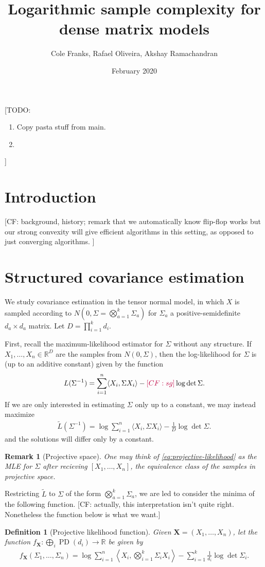 \documentclass{article}
\title{Logarithmic sample complexity for dense matrix models}
\author{Cole Franks, Rafael Oliveira, Akshay Ramachandran}
\date{February 2020}
\newtheorem{remark}{Remark}
\newtheorem{definition}{Definition}
\newcommand{\R}{{\mathbb{R}}}
\renewcommand{\vec}{\bm}
\newcommand\PD{\operatorname{PD}}
\newcommand{\CF}[1]{{\color{purple}[CF: #1]}}
\newcommand{\TODO}[1]{{\color{blue}[TODO: #1]}}
\begin{document}
\maketitle
\TODO{
\begin{enumerate}
\item Copy pasta stuff from main.
\item 
\end{enumerate}

}


\section{Introduction}
\CF{background, history; remark that we automatically know flip-flop works but our strong convexity will give efficient algorithms in this setting, as opposed to just converging algorithms. } 

\section{Structured covariance estimation}
We study covariance estimation in the tensor normal model, in which $X$ is sampled according to $N(0, \Sigma = \bigotimes_{a = 1}^{k} \Sigma_a)$ for $\Sigma_a$ a positive-semidefinite $d_a\times d_a$ matrix. Let $D = \prod_{i = 1}^k d_i$. 

First, recall the maximum-likelihood estimator for $\Sigma$ without any structure. If $X_1, \dots, X_n \in \R^D$ are the samples from $N(0, \Sigma)$, then the log-likelihood for $\Sigma$ is (up to an additive constant) given by the function 
$$L(\Sigma^{-1}) = \sum_{i = 1}^n \langle X_i,  \Sigma X_i\rangle - \CF{sg} \log\det \Sigma.$$
If we are only interested in estimating $\Sigma$ only up to a constant, we may instead maximize 
\begin{gather}\tilde{L}(\Sigma^{-1}) = \log \sum_{i = 1}^n \langle X_i,  \Sigma X_i\rangle - \frac{1}{D} \log\det \Sigma. \label{eq:projective-likelihood}\end{gather}
and the solutions will differ only by a constant.

\begin{remark}[Projective space] One may think of \cref{eq:projective-likelihood} as the MLE for $\Sigma$ after recieving $[X_1, \dots, X_n]$, the equivalence class of the samples in projective space.
\end{remark}
Restricting $\tilde{L}$ to $\Sigma$ of the form $\bigotimes_{a = 1}^{k} \Sigma_a$, we are led to consider the minima of the following function. \CF{actually, this interpretation isn't quite right. Nonetheless the function below is what we want.}
\begin{definition}[Projective likelihood function]
Given $\vec{X} = (X_1, \dots, X_n)$, let the function $f_{\vec X}:\bigoplus_{i} \PD(d_i) \to \R$ be given by 
\begin{gather}f_{\vec X}(\Sigma_1, \dots, \Sigma_n) = \log \sum_{i = 1}^n \left\langle X_i,  \bigotimes_{i = 1}^k \Sigma_i X_i\right\rangle - \sum_{i = 1}^k \frac{1}{d_i} \log\det \Sigma_i. \label{eq:projective-likelihood}\end{gather}
\end{definition}
\end{document}
